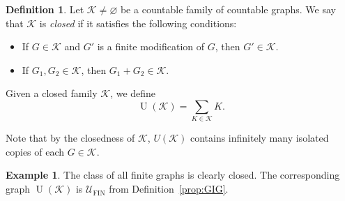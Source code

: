 \documentclass{amsart}
\theoremstyle{plain}
\theoremstyle{definition}
\newtheorem{df}[theorem]{Definition}
\newtheorem{exa}[theorem]{Example}
\theoremstyle{remark}
\numberwithin{equation}{section}
\newcommand{\K}{\mathcal{K}}
\newcommand{\UU}{\mathcal{U}}
\DeclareMathOperator{\UN}{U}
\DeclareMathOperator{\fin}{FIN}
\begin{document}
\begin{df}
Let \(\mathcal{K}\neq\varnothing\) be a countable family of countable graphs.  We say that \(\mathcal{K}\) is \emph{closed} if it satisfies the following conditions:
\begin{itemize}
  \item If \(G\in\mathcal{K}\) and \(G'\) is a finite modification of $G$, then \(G'\in\mathcal{K}\).
  \item If \(G_{1},G_{2}\in\mathcal{K}\), then $G_1+G_2 \in \mathcal K$.
\end{itemize}
 Given a closed family $\K$, we define 
 \[\UN(\K)=\sum\limits_{K\in \mathcal K}K.\] 
\end{df}
Note that by the closedness of $\mathcal K$, $U(\mathcal K)$ contains infinitely many isolated copies of each $G\in \mathcal K$.
\begin{exa}
The class of all finite graphs is clearly closed. The corresponding graph
\(\UN(\mathcal{K})\) is $\UU_{\fin}$ from Definition~\ref{prop:GIG}.
\end{exa}
\end{document}

